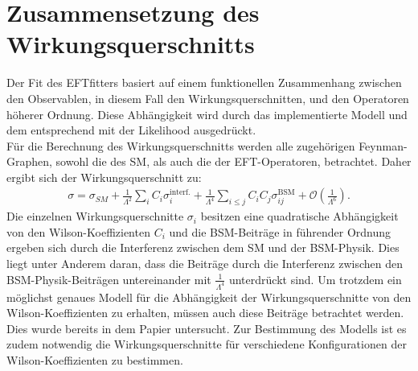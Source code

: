 \section{Zusammensetzung des Wirkungsquerschnitts}
Der Fit des EFTfitters basiert auf einem funktionellen Zusammenhang zwischen den Observablen, in diesem Fall den Wirkungsquerschnitten, und den Operatoren höherer Ordnung. Diese Abhängigkeit wird durch das implementierte Modell und dem entsprechend mit der Likelihood ausgedrückt.\\
Für die Berechnung des Wirkungsquerschnitts werden alle zugehörigen Feynman-Graphen, sowohl die des SM, als auch die der EFT-Operatoren, betrachtet. Daher ergibt sich der Wirkungsquerschnitt zu:
\begin{align}
  \sigma = \sigma_{SM} + \frac{1}{\Lambda^2} \sum_{i} C_i \sigma_i^\text{interf.} + \frac{1}{\Lambda^4} \sum_{i \leq j} C_i C_j \sigma_{ij}^\text{BSM} + \mathcal{O} \left(\frac{1}{\Lambda^6}\right).
\end{align}
Die einzelnen Wirkungsquerschnitte $\sigma_i$ besitzen eine quadratische Abhängigkeit von den Wilson-Koeffizienten $C_i$ und die BSM-Beiträge in führender Ordnung ergeben sich durch die Interferenz zwischen dem SM und der BSM-Physik. Dies liegt unter Anderem daran, dass die Beiträge durch die Interferenz zwischen den BSM-Physik-Beiträgen untereinander mit $\frac{1}{\Lambda^4}$ unterdrückt sind. Um trotzdem ein möglichst genaues Modell für die Abhängigkeit der Wirkungsquerschnitte von den Wilson-Koeffizienten zu erhalten, müssen auch diese Beiträge betrachtet werden. Dies wurde bereits in dem Papier\cite{Wilson-Beiträge} untersucht. Zur Bestimmung des Modells ist es zudem notwendig die Wirkungsquerschnitte für verschiedene Konfigurationen der Wilson-Koeffizienten zu bestimmen.

